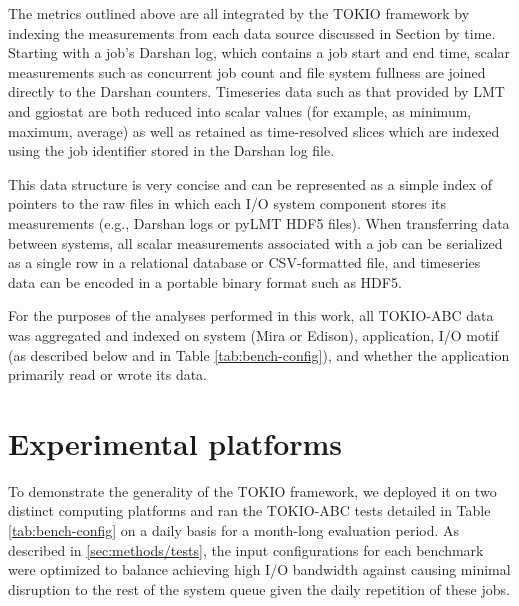 The metrics outlined above are all integrated by the TOKIO framework by indexing the measurements from each data source discussed in Section \label{sec:methods} by time.
Starting with a job's Darshan log, which contains a job start and end time, scalar measurements such as concurrent job count and file system fullness are joined directly to the Darshan counters.
Timeseries data such as that provided by LMT and ggiostat are both reduced into scalar values (for example, as minimum, maximum, average) as well as retained as time-resolved slices which are indexed using the job identifier stored in the Darshan log file.

This data structure is very concise and can be represented as a simple index of pointers to the raw files in which each I/O system component stores its measurements (e.g., Darshan logs or pyLMT HDF5 files).
When transferring data between systems, all scalar measurements associated with a job can be serialized as a single row in a relational database or CSV-formatted file, and timeseries data can be encoded in a portable binary format such as HDF5.

For the purposes of the analyses performed in this work, all TOKIO-ABC data was aggregated and indexed on system (Mira or Edison), application, I/O motif (as described below and in Table \ref{tab:bench-config}), and whether the application primarily read or wrote its data. 

\section{Experimental platforms} \label{sec:platforms}

To demonstrate the generality of the TOKIO framework, we deployed it on two distinct computing platforms and ran the TOKIO-ABC tests detailed in Table \ref{tab:bench-config} on a daily basis for a month-long evaluation period.
As described in \ref{sec:methods/tests}, the input configurations for each benchmark were optimized to balance achieving high I/O bandwidth against causing minimal disruption to the rest of the system queue given the daily repetition of these jobs.

